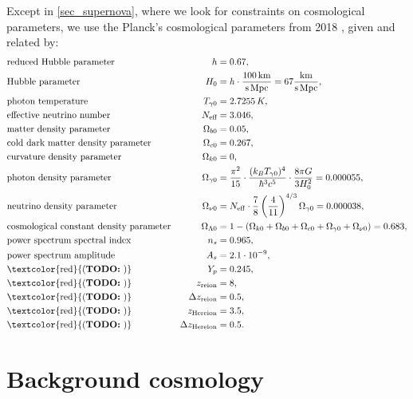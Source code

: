 \documentclass[10pt,a4paper]{article}
\newcommand\TODO[1]{\textcolor{red}{(\textbf{TODO:} #1)}}
\begin{document}
Except in \cref{sec_supernova}, where we look for constraints on cosmological parameters, we use the Planck's cosmological parameters from 2018 \cite{planckcollaborationPlanck2018Results2020},
given and related by:
\begin{equation}
\begin{aligned}
	& \text{reduced Hubble parameter} & h &= 0.67, \\
	& \text{Hubble parameter} & H_0 &= h \cdot \frac{100\,\mathrm{km}}{\mathrm{s}\,\mathrm{Mpc}} = 67 \frac{\mathrm{km}}{\mathrm{s}\,\mathrm{Mpc}}, \\
	& \text{photon temperature} & T_{\gamma0} &= 2.7255\,K, \\
	& \text{effective neutrino number} & N_\text{eff} &= 3.046, \\
	& \text{matter density parameter} & \Omega_{b0} &= 0.05, \\
	& \text{cold dark matter density parameter} & \Omega_{c0} &= 0.267,\\
	& \text{curvature density parameter} & \Omega_{k0} &= 0, \\
	& \text{photon density parameter} & \Omega_{\gamma0} &= \frac{\pi^2}{15} \cdot \frac{(k_B T_{\gamma0})^4}{\hbar^3 c^5} \cdot \frac{8 \pi G}{3 H_0^2} = 0.000055, \\
	& \text{neutrino density parameter} & \Omega_{\nu0} &= N_{\rm eff}\cdot \frac{7}{8}\left(\frac{4}{11}\right)^{4/3}\Omega_{\gamma 0} = 0.000038, \\
	& \text{cosmological constant density parameter} & \Omega_{\Lambda 0} &= 1 - (\Omega_{k 0}+\Omega_{b 0}+\Omega_{c0}+\Omega_{\gamma 0}+\Omega_{\nu 0}) = 0.683,\\
	& \text{power spectrum spectral index} & n_s &= 0.965, \\
	& \text{power spectrum amplitude} & A_s &= 2.1\cdot 10^{-9}, \\
	& \text{\TODO{}} & Y_p &= 0.245, \\
	& \text{\TODO{}} & z_{\rm reion} &= 8, \\
	& \text{\TODO{}} & \Delta z_{\rm reion} &= 0.5, \\
	& \text{\TODO{}} & z_{\rm He reion} &= 3.5, \\
	& \text{\TODO{}} & \Delta z_{\rm He reion} &= 0.5.
\end{aligned}
\label{eq_planck2018}
\end{equation}


\clearpage

\section{Background cosmology}
\label{sec_background_cosmology}
\end{document}
